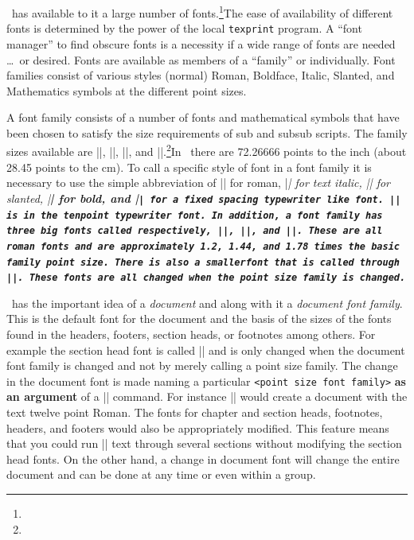   \relax \fi %
\def\cqu{}



\intex\ has available to it a large number of fonts.\footnote{\dagger}{The
ease of availability of different fonts is determined by the power of the
local {\tt texprint} program. A ``font manager'' to find obscure fonts is a
necessity if a wide range of fonts are needed \dots\ or desired.}
Fonts are available as members of a ``family'' or individually. 
Font families consist of various styles (normal) Roman, Boldface,
Italic, Slanted, and Mathematics symbols at the different point sizes. 

A font family consists of a number of fonts and mathematical symbols that
have been chosen to satisfy the size requirements of sub and subsub scripts.
The family sizes available are 
{\twelvepoint |\twelvepoint|}, {\tenpoint |\tenpoint|}, 
{\ninepoint |\ninepoint|}, 
and 
{\eightpoint |\eightpoint|}.\footnote{\ddagger}{In \tex\ there are 72.26666 points to the inch (about 28.45 points to the
cm).}
To call a specific style of font in a font
family it is necessary to use the simple abbreviation of |\rm| for roman,
|\it| for text italic, |\sl| for slanted, |\bf| for bold, and |\tt| for a
fixed spacing typewriter like font. |\tt| is in the tenpoint typewriter font.
In addition, a font family has three {\it big} fonts called respectively,
|\bigfont|, |\biggfont|, and |\bigggfont|. These are all roman fonts and are
approximately 1.2, 1.44, and 1.78 times the basic family point size. There is
also a {\smallerfont smallerfont} that is  called through |\smallerfont|.
These fonts are all changed when the point size family is changed.

\intex\ has the important idea of a {\it document} and along with it a 
{\it document font family}. 
This is the
default font for the document and the basis of the sizes of the fonts found
in the headers, footers, section heads, or footnotes among others. For
example the section head font is called |\sheadfont| and is only changed when
the document font family is changed and not by merely calling a point size
family. 
The change in the document font is made naming a particular {\tt <point size
font family>} {\bf as an argument} of a |\documentstyle| command. For
instance
|\documentstyle{\twelvepoint}| would create a document with the 
text twelve point Roman.
The fonts for
chapter and section heads, footnotes, headers, and footers would
also be appropriately modified. This
feature means that you could run |\eightpoint| text through several sections
without modifying the section head fonts. On the other hand, a change in
document font will change the entire document and can be done at any time or
even within a group. 

